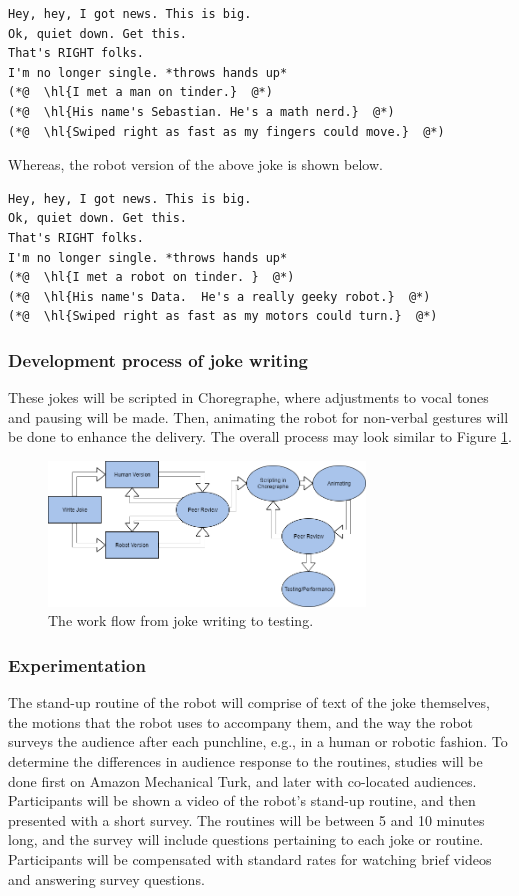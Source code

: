 \documentclass[onecolumn, draftclsnofoot,10pt, compsoc]{IEEEtran}
\begin{document}
\begin{lstlisting}
Hey, hey, I got news. This is big.
Ok, quiet down. Get this.
That's RIGHT folks.
I'm no longer single. *throws hands up*
(*@  \hl{I met a man on tinder.}  @*)
(*@  \hl{His name's Sebastian. He's a math nerd.}  @*)
(*@  \hl{Swiped right as fast as my fingers could move.}  @*)
\end{lstlisting}

Whereas, the robot version of the above joke is shown below.

\begin{lstlisting}
Hey, hey, I got news. This is big.
Ok, quiet down. Get this.
That's RIGHT folks.
I'm no longer single. *throws hands up*
(*@  \hl{I met a robot on tinder. }  @*)
(*@  \hl{His name's Data.  He's a really geeky robot.}  @*)
(*@  \hl{Swiped right as fast as my motors could turn.}  @*)
\end{lstlisting}

\subsubsection{Development process of joke writing}
These jokes will be scripted in Choregraphe, where adjustments to vocal tones and pausing will be made.
Then, animating the robot for non-verbal gestures will be done to enhance the delivery.
The overall process may look similar to Figure \ref{fig:write_process}.

\begin{figure}[H]
  \centering
  \includegraphics[width=0.75\textwidth,height=0.75\textheight,keepaspectratio]{joke_writing_process}
  \caption{The work flow from joke writing to testing.}
	\label{fig:write_process}
\end{figure}

\subsubsection{Experimentation}
The stand-up routine of the robot will comprise of text of the joke themselves, the motions that the robot uses to
accompany them, and the way the robot surveys the audience after each punchline, e.g., in a human or robotic fashion.
To determine the differences in audience response to the routines, studies will be done first on Amazon Mechanical
Turk, and later with co-located audiences. Participants will be shown a video of the robot’s stand-up routine, and then
presented with a short survey. The routines will be between 5 and 10 minutes long, and the survey will include questions
pertaining to each joke or routine. Participants will be compensated with standard rates for watching brief videos and
answering survey questions.
\end{document}
